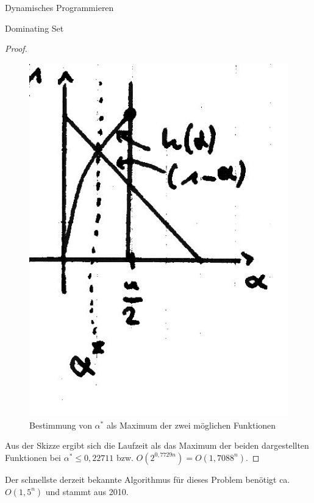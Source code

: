 \begin{chapter}{Dynamisches Programmieren}
\begin{section}{Dominating Set}
\begin{proof}
    \begin{figure}[h]
      \centering
      \includegraphics[width=.25\textwidth]{./Bilder/b02.jpg}
      \caption{Bestimmung von \(\alpha^*\) als Maximum der zwei möglichen Funktionen}
    \end{figure}
    
    Aus der Skizze ergibt sich die Laufzeit als das Maximum der beiden dargestellten Funktionen bei \(\alpha^* \leq 0,22711\) bzw. \(O(2^{0,7729n}) = O(1,7088^n)\).
  \end{proof}
  
  Der schnellste derzeit bekannte Algorithmus für dieses Problem benötigt ca. \(O(1,5^n)\) und stammt aus 2010.
\end{section}
\end{chapter}